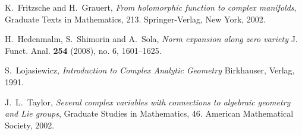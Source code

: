 \documentclass[11pt]{amsart}
\theoremstyle{definition}
\numberwithin{equation}{section}
\begin{document}
\begin{thebibliography}{99}
K.~Fritzsche and H.~Grauert, \emph{{From holomorphic function to complex manifolds}}, Graduate Texts in Mathematics, 213. Springer-Verlag, New York, 2002.

H.~Hedenmalm, S.~Shimorin and A.~Sola, \emph{Norm expansion along zero variety} J. Funct. Anal.  \textbf{254} (2008),  no. 6, 1601--1625. 

S.~Lojasiewicz, \emph{Introduction to Complex Analytic Geometry} Birkhauser, Verlag, 1991.

J.~L.~Taylor, \emph{Several complex variables with connections to algebraic geometry and Lie groups}, Graduate Studies in Mathematics, 46. American Mathematical Society, 2002.

\end{thebibliography}
\end{document}
